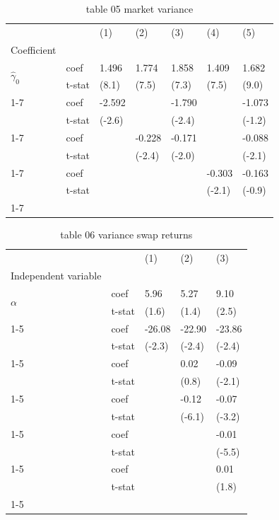 \documentclass{article}
\begin{document}
\begin{table}[htbp]
  \centering
  \caption{table 05 market variance}
  \label{tab:table_05_market_variance}
  \begin{tabular}{lllllll}
\toprule
 &  & (1) & (2) & (3) & (4) & (5) \\
Coefficient &  &  &  &  &  &  \\
\midrule
\multirow[t]{2}{*}{$\hat{\gamma}_0$} & coef & 1.496 & 1.774 & 1.858 & 1.409 & 1.682 \\
 & t-stat & (8.1) & (7.5) & (7.3) & (7.5) & (9.0) \\
\cline{1-7}
\multirow[t]{2}{*}{$\hat{\gamma}_B$} & coef & -2.592 &  & -1.790 &  & -1.073 \\
 & t-stat & (-2.6) &  & (-2.4) &  & (-1.2) \\
\cline{1-7}
\multirow[t]{2}{*}{$\hat{\gamma}_{\sigma^2}$} & coef &  & -0.228 & -0.171 &  & -0.088 \\
 & t-stat &  & (-2.4) & (-2.0) &  & (-2.1) \\
\cline{1-7}
\multirow[t]{2}{*}{$\hat{\gamma}_{int}$} & coef &  &  &  & -0.303 & -0.163 \\
 & t-stat &  &  &  & (-2.1) & (-0.9) \\
\cline{1-7}
\bottomrule
\end{tabular}
\end{table}

\begin{table}[htbp]
  \centering
  \caption{table 06 variance swap returns}
  \label{tab:table_06_variance_swap_returns}
  \begin{tabular}{lllll}
\toprule
 &  & (1) & (2) & (3) \\
Independent variable &  &  &  &  \\
\midrule
\multirow[t]{2}{*}{$\alpha$} & coef & 5.96 & 5.27 & 9.10 \\
 & t-stat & (1.6) & (1.4) & (2.5) \\
\cline{1-5}
\multirow[t]{2}{*}{$I_{B\sigma^2}$} & coef & -26.08 & -22.90 & -23.86 \\
 & t-stat & (-2.3) & (-2.4) & (-2.4) \\
\cline{1-5}
\multirow[t]{2}{*}{$\tilde{r}^e_{m,t}$} & coef &  & 0.02 & -0.09 \\
 & t-stat &  & (0.8) & (-2.1) \\
\cline{1-5}
\multirow[t]{2}{*}{$I_{B\sigma^2} \cdot \tilde{r}^e_{m,t}$} & coef &  & -0.12 & -0.07 \\
 & t-stat &  & (-6.1) & (-3.2) \\
\cline{1-5}
\multirow[t]{2}{*}{$\tilde{r}_{vs,t}$} & coef &  &  & -0.01 \\
 & t-stat &  &  & (-5.5) \\
\cline{1-5}
\multirow[t]{2}{*}{$I_{B\sigma^2} \cdot \tilde{r}_{vs,t}$} & coef &  &  & 0.01 \\
 & t-stat &  &  & (1.8) \\
\cline{1-5}
\bottomrule
\end{tabular}
\end{table}
\end{document}

